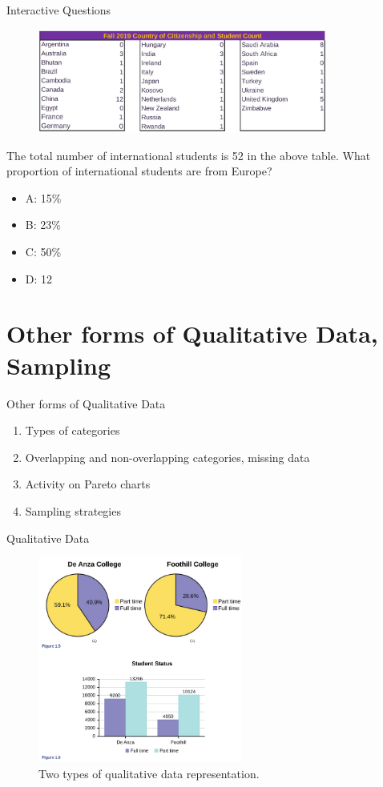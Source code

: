 \documentclass{beamer}
\begin{document}
\begin{frame}{Interactive Questions}
\begin{figure}
\centering
\includegraphics[width=0.85\textwidth]{figures/map.png}
\end{figure}
The total number of international students is 52 in the above table.  What proportion of international students are from Europe?
\begin{itemize}
\item A: 15\%
\item B: 23\%
\item C: 50\%
\item D: 12
\end{itemize}
\end{frame}

\section{Other forms of Qualitative Data, Sampling}

\begin{frame}{Other forms of Qualitative Data}
\begin{enumerate}
\item Types of categories
\item Overlapping and non-overlapping categories, missing data
\item Activity on Pareto charts
\item Sampling strategies
\end{enumerate}
\end{frame}

\begin{frame}{Qualitative Data}
\begin{figure}
\centering
\includegraphics[width=0.6\textwidth]{figures/qualitativeData.png}
\caption{\label{fig:qual} Two types of qualitative data representation.}
\end{figure}
\end{frame}
\end{document}
